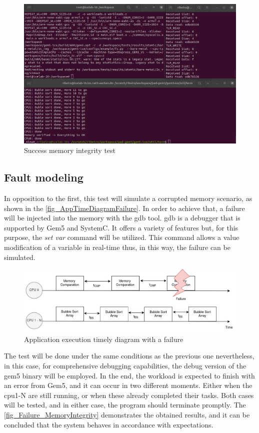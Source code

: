 \begin{figure}[H]
	\centering
 	\includegraphics[width=0.8\linewidth]{Images/Success_MemoryIntegrity.png} 
 	\caption{Success memory integrity test}
\end{figure}


\subsection{Fault modeling}

In opposition to the first, this test will simulate a corrupted memory scenario, as shown in the \autoref{fig_AppTimeDiagramFailure}. 
In order to achieve that, a failure will be injected into the memory with the \gls{gdb} tool. \gls*{gdb} is a debugger 
that is supported by Gem5 and SystemC. It offers a variety of features but, for this purpose, the \textit{set var} command will be utilized. 
This command allows a value modification of a variable in real-time thus, in this way, the failure can be simulated.

\begin{figure}[H]
	\centering
 	\includegraphics[width=0.8\linewidth]{Images/AppTimeDiagramFailure.png}
 	\caption{Application execution timely diagram with a failure}
	 \label{fig_AppTimeDiagramFailure}
\end{figure}


The test will be done under the same conditions as the previous one nevertheless, in this case, for comprehensive debugging capabilities, 
the debug version of the gem5 binary will be employed. In the end, the workload is expected to finish with an error from Gem5, and it can occur 
in two different moments. Either when the \gls*{cpu}1-N are still running, or when these already completed their tasks. Both cases  
will be tested, and in either case, the program should terminate promptly. The \autoref{fig_Failure_MemoryIntegrity} demonstrates the obtained 
results, and it can be concluded that the system behaves in accordance with expectations.

